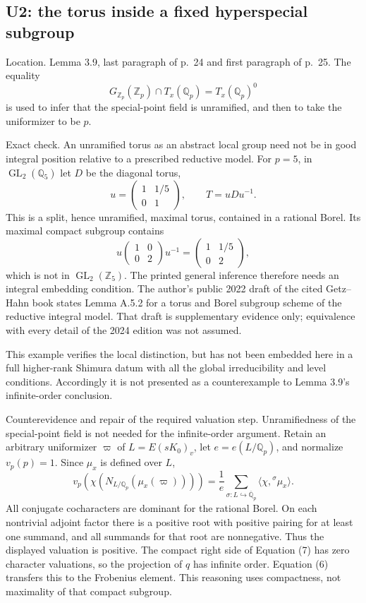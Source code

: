 \documentclass[10pt]{article}
\begin{document}
\subsection*{U2: the torus inside a fixed hyperspecial subgroup}
Location. Lemma 3.9, last paragraph of p. 24 and first paragraph of p. 25. The equality \[G_{\mathbb Z_p}(\mathbb Z_p)\cap T_x(\mathbb Q_p)=T_x(\mathbb Q_p)^0\] is used to infer that the special-point field is unramified, and then to take the uniformizer to be \(p\).\par
Exact check. An unramified torus as an abstract local group need not be in good integral position relative to a prescribed reductive model. For \(p=5\), in \(\operatorname{GL}_2(\mathbb Q_5)\) let \(D\) be the diagonal torus, \[u=\begin{pmatrix}1&1/5\\0&1\end{pmatrix},\qquad T=uDu^{-1}.\] This is a split, hence unramified, maximal torus, contained in a rational Borel. Its maximal compact subgroup contains \[u\begin{pmatrix}1&0\\0&2\end{pmatrix}u^{-1}
 =\begin{pmatrix}1&1/5\\0&2\end{pmatrix},\] which is not in \(\operatorname{GL}_2(\mathbb Z_5)\). The printed general inference therefore needs an integral embedding condition. The author’s public 2022 draft of the cited Getz–Hahn book states Lemma A.5.2 for a torus and Borel subgroup scheme of the reductive integral model. That draft is supplementary evidence only; equivalence with every detail of the 2024 edition was not assumed.\par
This example verifies the local distinction, but has not been embedded here in a full higher-rank Shimura datum with all the global irreducibility and level conditions. Accordingly it is not presented as a counterexample to Lemma 3.9’s infinite-order conclusion.\par
Counterevidence and repair of the required valuation step. Unramifiedness of the special-point field is not needed for the infinite-order argument. Retain an arbitrary uniformizer \(\varpi\) of \(L=E(sK_0)_v\), let \(e=e(L/\mathbb Q_p)\), and normalize \(v_p(p)=1\). Since \(\mu_x\) is defined over \(L\), \[v_p\!\left(\chi\!\left(N_{L/\mathbb Q_p}(\mu_x(\varpi))\right)\right)
 =\frac{1}{e}\sum_{\sigma:L\hookrightarrow\overline{\mathbb Q}_p}
       \langle\chi,{}^\sigma\mu_x\rangle.\] All conjugate cocharacters are dominant for the rational Borel. On each nontrivial adjoint factor there is a positive root with positive pairing for at least one summand, and all summands for that root are nonnegative. Thus the displayed valuation is positive. The compact right side of Equation (7) has zero character valuations, so the projection of \(q\) has infinite order. Equation (6) transfers this to the Frobenius element. This reasoning uses compactness, not maximality of that compact subgroup.\par
\end{document}
